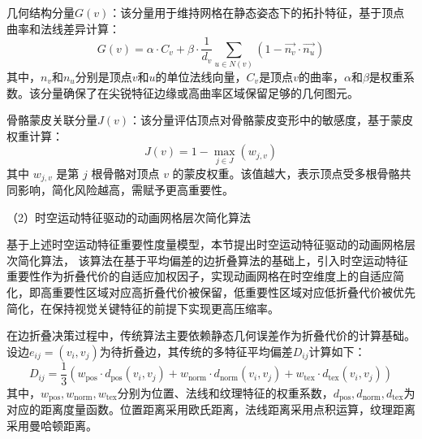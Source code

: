 几何结构分量$G(v)$：该分量用于维持网格在静态姿态下的拓扑特征，基于顶点曲率和法线差异计算：
\begin{equation}
G(v) = \alpha \cdot C_v + \beta \cdot \frac{1}{d_v} \sum_{u \in N(v)} (1 - \overrightarrow{n_v} \cdot \overrightarrow{n_u})
\label{eq:geometry}
\end{equation}
其中，$n_v$和$n_u$分别是顶点$v$和$u$的单位法线向量，$C_v$是顶点$v$的曲率，$\alpha$和$\beta$是权重系数。该分量确保了在尖锐特征边缘或高曲率区域保留足够的几何图元。

骨骼蒙皮关联分量$J(v)$：该分量评估顶点对骨骼蒙皮变形中的敏感度，基于蒙皮权重计算：
\begin{equation}
J(v) = 1 - \max_{j \in J} (w_{j,v})
\label{eq:skinning_sensitivity}
\end{equation}
其中 $w_{j,v}$ 是第 $j$ 根骨骼对顶点 $v$ 的蒙皮权重。该值越大，表示顶点受多根骨骼共同影响，简化风险越高，需赋予更高重要性。

（2）时空运动特征驱动的动画网格层次简化算法

基于上述时空运动特征重要性度量模型，本节提出时空运动特征驱动的动画网格层次简化算法，
该算法在基于平均偏差的边折叠算法的基础上，引入时空运动特征重要性作为折叠代价的自适应加权因子，实现动画网格在时空维度上的自适应简化，即高重要性区域对应高折叠代价被保留，低重要性区域对应低折叠代价被优先简化，在保持视觉关键特征的前提下实现更高压缩率。

在边折叠决策过程中，传统算法主要依赖静态几何误差作为折叠代价的计算基础。设边$e_{ij}=(v_i,v_j)$为待折叠边，其传统的多特征平均偏差$D_{ij}$计算如下：
\begin{equation}
D_{ij} = \frac{1}{3}\left( w_{\text{pos}} \cdot d_{\text{pos}}(v_i, v_j) + w_{\text{norm}} \cdot d_{\text{norm}}(v_i, v_j) + w_{\text{tex}} \cdot d_{\text{tex}}(v_i, v_j) \right)
\label{eq:multi_feature}
\end{equation}
其中，$w_{\text{pos}}, w_{\text{norm}}, w_{\text{tex}}$分别为位置、法线和纹理特征的权重系数，$d_{\text{pos}}, d_{\text{norm}}, d_{\text{tex}}$为对应的距离度量函数。位置距离采用欧氏距离，法线距离采用点积运算，纹理距离采用曼哈顿距离。

